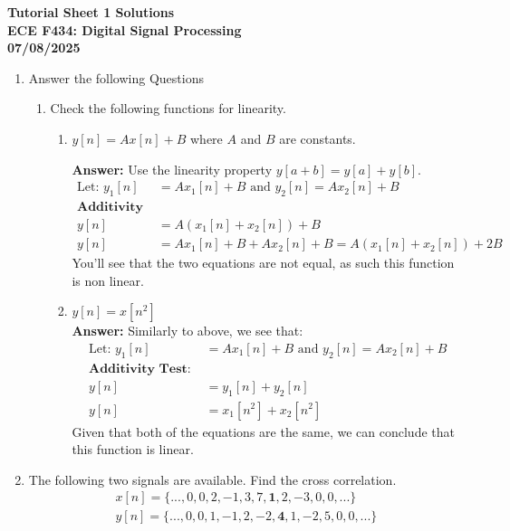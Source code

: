 \documentclass{article}
\begin{document}
	\begin{center}
		\large
		\textbf{Tutorial Sheet 1 Solutions}\\
		\large
		\textbf{ECE F434: Digital Signal Processing}\\
		\normalsize
		\textbf{07/08/2025}
	\end{center}
	\begin{enumerate}
		\item Answer the following Questions 
		\begin{enumerate}
			\item Check the following functions for linearity. 
			\begin{enumerate}
				\item $y[n] = Ax[n] + B$ where $A$ and $B$ are constants.
			
				\textbf{Answer:} Use the linearity property $y[a + b] = y[a] + y[b]$.
					\begin{align}
						\text{Let: }y_1[n] &= Ax_1[n] + B \text{ and } y_2[n] = Ax_2[n] + B \\
						\textbf{Additivity Test: }\\
						y[n] &= A(x_1[n] + x_2[n]) + B \\
						y[n] &= Ax_1[n] + B + Ax_2[n] + B = A(x_1[n] + x_2[n]) + 2B
					\end{align}
					You'll see that the two equations are not equal, as such this function is non linear.
				\item $y[n] = x[n^2]$\\
					\textbf{Answer:} Similarly to above, we see that:
					\begin{align}
						\text{Let: }y_1[n] &= Ax_1[n] + B \text{ and } y_2[n] = Ax_2[n] + B \\
						\textbf{Additivity Test: }\\
						y[n] &= y_1[n] + y_2[n]\\
						y[n] &= x_1[n^2] + x_2[n^2]
					\end{align}
					Given that both of the equations are the same, we can conclude that this function is linear. 	
			\end{enumerate}
		\end{enumerate}
		\item  The following two signals are available. Find the cross correlation.
		\begin{align}
			x[n] = \{... , 0, 0, 2, -1, 3, 7,\mathbf{1} , 2, -3, 0, 0, ...\}\\
			y[n] = \{... , 0, 0, 1, -1, 2, -2, \mathbf{4}, 1, -2, 5, 0, 0, ...\}

\end{align}
\end{enumerate}
\end{document}
